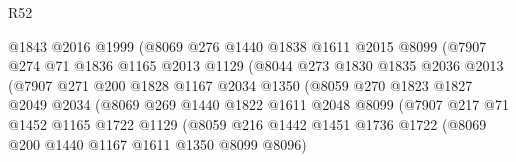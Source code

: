 \begin{lexlean}{R52}
\begin{coremodule}
                                @1843
                                @2016
                                @1999
                                (@8069
                                  @276
                                  @1440
                                  @1838
                                  @1611
                                  @2015
                                  @8099
                                  (@7907
                                    @274
                                    @71
                                    @1836
                                    @1165
                                    @2013
                                    @1129
                                    (@8044
                                      @273
                                      @1830
                                      @1835
                                      @2036
                                      @2013
                                      (@7907
                                        @271
                                        @200
                                        @1828
                                        @1167
                                        @2034
                                        @1350
                                        (@8059
                                          @270
                                          @1823
                                          @1827
                                          @2049
                                          @2034
                                          (@8069
                                            @269
                                            @1440
                                            @1822
                                            @1611
                                            @2048
                                            @8099
                                            (@7907
                                              @217
                                              @71
                                              @1452
                                              @1165
                                              @1722
                                              @1129
                                              (@8059
                                                @216
                                                @1442
                                                @1451
                                                @1736
                                                @1722
                                                (@8069 @200 @1440 @1167 @1611 @1350 @8099 @8096)

\end{coremodule}
\end{lexlean}
